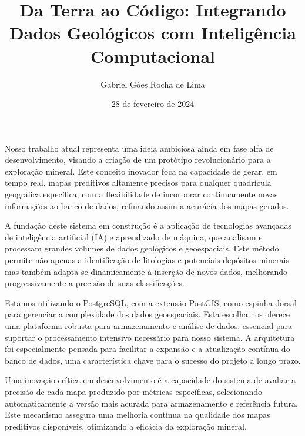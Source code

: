 \documentclass[11pt]{article} %
\begin{document}
\title{Da Terra ao Código: Integrando Dados Geológicos com Inteligência Computacional} %
\author{Gabriel Góes Rocha de Lima} %
\date{28 de fevereiro de 2024} %
\maketitle %

\par{
Nosso trabalho atual representa uma ideia ambiciosa ainda em fase alfa de desenvolvimento,
visando a criação de um protótipo revolucionário para a exploração mineral. Este conceito inovador
foca na capacidade de gerar, em tempo real, mapas preditivos altamente precisos para qualquer
quadrícula geográfica específica, com a flexibilidade de incorporar continuamente novas
informações ao banco de dados, refinando assim a acurácia dos mapas gerados.
}

\par{

A fundação deste sistema em construção é a aplicação de tecnologias avançadas de
inteligência artificial (IA) e aprendizado de máquina, que analisam e processam
grandes volumes de dados geológicos e geoespaciais. Este método permite não apenas
a identificação de litologias e potenciais depósitos minerais mas também adapta-se
dinamicamente à inserção de novos dados, melhorando progressivamente a precisão
de suas classificações.
}

\par{Estamos utilizando o PostgreSQL, com a extensão PostGIS, como espinha dorsal
para gerenciar a complexidade dos dados geoespaciais. Esta escolha nos oferece uma
plataforma robusta para armazenamento e análise de dados, essencial para suportar o
processamento intensivo necessário para nosso sistema. A arquitetura foi especialmente
pensada para facilitar a expansão e a atualização contínua do banco de dados, uma
característica chave para o sucesso do projeto a longo prazo.}

\par{Uma inovação crítica em desenvolvimento é a capacidade do sistema de avaliar
a precisão de cada mapa produzido por métricas específicas, selecionando automaticamente
a versão mais acurada para armazenamento e referência futura. Este mecanismo assegura uma
melhoria contínua na qualidade dos mapas preditivos disponíveis, otimizando a
eficácia da exploração mineral.}
\end{document}
